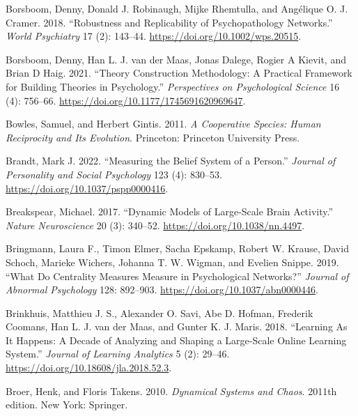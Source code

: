 \documentclass[
  a4paper,
  DIV=11,
  numbers=noendperiod,
  oneside]{scrreprt}
\newlength{\cslhangindent}
\newenvironment{CSLReferences}[2] %
 {\begin{list}{}{%
  \setlength{\itemindent}{0pt}
  \setlength{\leftmargin}{0pt}
  \setlength{\parsep}{0pt}
  \ifodd #1
   \setlength{\leftmargin}{\cslhangindent}
   \setlength{\itemindent}{-1\cslhangindent}
  \fi
  \setlength{\itemsep}{#2\baselineskip}}}
 {\end{list}}
\begin{document}
\begin{CSLReferences}{1}{0}
Borsboom, Denny, Donald J. Robinaugh, Mijke Rhemtulla, and Angélique O.
J. Cramer. 2018. {``Robustness and Replicability of Psychopathology
Networks.''} \emph{World Psychiatry} 17 (2): 143--44.
\url{https://doi.org/10.1002/wps.20515}.

Borsboom, Denny, Han L. J. van der Maas, Jonas Dalege, Rogier A Kievit,
and Brian D Haig. 2021. {``Theory {Construction Methodology}: {A
Practical Framework} for {Building Theories} in {Psychology}.''}
\emph{Perspectives on Psychological Science} 16 (4): 756--66.
\url{https://doi.org/10.1177/1745691620969647}.

Bowles, Samuel, and Herbert Gintis. 2011. \emph{A Cooperative Species:
Human Reciprocity and Its Evolution}. {Princeton}: {Princeton University
Press}.

Brandt, Mark J. 2022. {``Measuring the Belief System of a Person.''}
\emph{Journal of Personality and Social Psychology} 123 (4): 830--53.
\url{https://doi.org/10.1037/pspp0000416}.

Breakspear, Michael. 2017. {``Dynamic Models of Large-Scale Brain
Activity.''} \emph{Nature Neuroscience} 20 (3): 340--52.
\url{https://doi.org/10.1038/nn.4497}.

Bringmann, Laura F., Timon Elmer, Sacha Epskamp, Robert W. Krause, David
Schoch, Marieke Wichers, Johanna T. W. Wigman, and Evelien Snippe. 2019.
{``What Do Centrality Measures Measure in Psychological Networks?''}
\emph{Journal of Abnormal Psychology} 128: 892--903.
\url{https://doi.org/10.1037/abn0000446}.

Brinkhuis, Matthieu J. S., Alexander O. Savi, Abe D. Hofman, Frederik
Coomans, Han L. J. van der Maas, and Gunter K. J. Maris. 2018.
{``Learning {As It Happens}: {A Decade} of {Analyzing} and {Shaping} a
{Large-Scale Online Learning System}.''} \emph{Journal of Learning
Analytics} 5 (2): 29--46. \url{https://doi.org/10.18608/jla.2018.52.3}.

Broer, Henk, and Floris Takens. 2010. \emph{Dynamical Systems and
Chaos}. 2011th edition. New York: Springer.


\end{CSLReferences}
\end{document}
